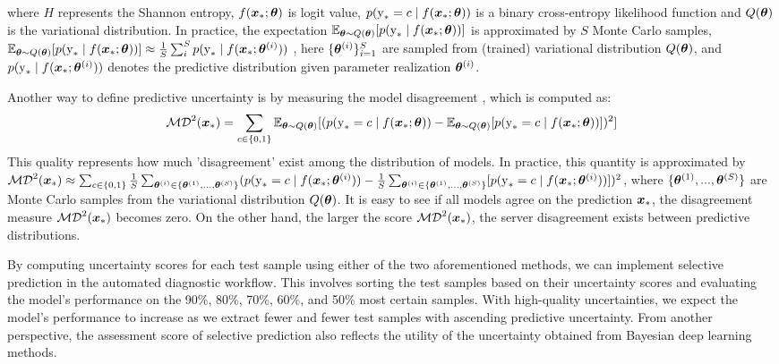 \documentclass[10pt]{article} %
\begin{document}
where $H$ represents the Shannon entropy, $f({\bm{x}}_*;{\bm{\theta}})$ is logit value, $p({\textnormal{y}}_*=c \mid f({\bm{x}}_* ; {\bm{\theta}}))$ is a binary cross-entropy likelihood function and $Q({\bm{\theta}})$ is the variational distribution. In practice, the expectation $\mathbb{E}_{{\bm{\theta}} \sim Q({\bm{\theta}})}[p({\textnormal{y}}_* \mid f({\bm{x}}_* ; {\bm{\theta}}))]$ is approximated by $S$ Monte Carlo samples,
$\mathbb{E}_{{\bm{\theta}} \sim Q({\bm{\theta}})}[p({\textnormal{y}}_* \mid f({\bm{x}}_* ; {\bm{\theta}}))] \approx \frac{1}{S} \sum_i^S p({\textnormal{y}}_* \mid f({\bm{x}}_* ; {\bm{\theta}}^{(i)}))$ , here $\{{\bm{\theta}}^{(i)}\}_{i=1}^S$ are sampled from (trained) variational distribution $Q({\bm{\theta}})$, and $p({\textnormal{y}}_* \mid f({\bm{x}}_* ; {\bm{\theta}}^{(i)}))$ denotes the predictive distribution given parameter realization ${\bm{\theta}}^{\left(i\right)}$.

Another way to define predictive uncertainty is by measuring the model disagreement \cite{d2021repulsive}, which is computed as:
\begin{equation}
    \mathcal{MD}^2 ({\bm{x}}_*) = \sum_{c \in\{0,1\}} \mathbb{E}_{{\bm{\theta}} \sim Q({\bm{\theta}})}[(p({\textnormal{y}}_*=c \mid f({\bm{x}}_*; {\bm{\theta}})) - \mathbb{E}_{{\bm{\theta}} \sim Q({\bm{\theta}})}[p({\textnormal{y}}_* = c\mid f({\bm{x}}_* ; {\bm{\theta}}))])^2]
\end{equation}
This quality represents how much 'disagreement' exist among the distribution of models. In practice, this quantity is approximated by $\mathcal{MD}^2({\bm{x}}_*) \approx \sum_{c \in\{0,1\}} \frac{1}{S}\sum_{{\bm{\theta}}^{(i)} \in\{{\bm{\theta}}^{(1)},...,{\bm{\theta}}^{(S)}\}} (p({\textnormal{y}}_*=c \mid f({\bm{x}}_*; {\bm{\theta}}^{(i)})) - \frac{1}{S}\sum_{{\bm{\theta}}^{(i)} \in\{{\bm{\theta}}^{(1)},...,{\bm{\theta}}^{(S)}\}}[p({\textnormal{y}}_* = c\mid f({\bm{x}}_* ; {\bm{\theta}}^{(i)}))])^2$, where $\{{\bm{\theta}}^{(1)},...,{\bm{\theta}}^{(S)}\}$ are Monte Carlo samples from the variational distribution $Q({\bm{\theta}})$. It is easy to see if all models agree on the prediction ${\bm{x}}_*$, the disagreement measure $\mathcal{MD}^2 ({\bm{x}}_*)$ becomes zero. On the other hand, the larger the score $\mathcal{MD}^2 ({\bm{x}}_*)$, the server disagreement exists between predictive distributions.

By computing uncertainty scores for each test sample using either of the two aforementioned methods, we can implement selective prediction in the automated diagnostic workflow. This involves sorting the test samples based on their uncertainty scores and evaluating the model's performance on the 90\%, 80\%, 70\%, 60\%, and 50\% most certain samples. With high-quality uncertainties, we expect the model's performance to increase as we extract fewer and fewer test samples with ascending predictive uncertainty. From another perspective, the assessment score of selective prediction also reflects the utility of the uncertainty obtained from Bayesian deep learning methods.
\end{document}
